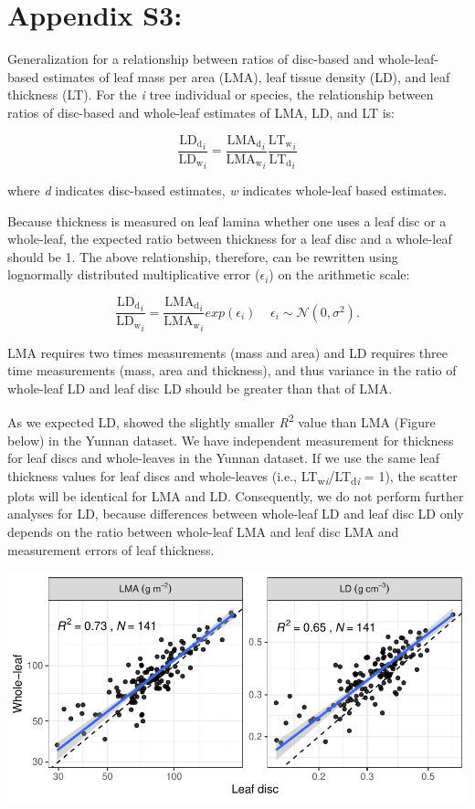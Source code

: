 \documentclass[
  12pt,
]{article}
\author{}
\date{\vspace{-2.5em}}
\begin{document}
\hypertarget{appendix-s3}{%
\section{Appendix S3:}\label{appendix-s3}}

Generalization for a relationship between ratios of disc-based and whole-leaf-based estimates of leaf mass per area (LMA), leaf tissue density (LD), and leaf thickness (LT).
For the \emph{i} tree individual or species, the relationship between ratios of disc-based and whole-leaf estimates of LMA, LD, and LT is:

\[
\frac{\mathrm{LD_d}_i}{\mathrm{LD_w}_i} = \frac{\mathrm{LMA_d}_i}{\mathrm{LMA_w}_i} \frac{\mathrm{LT_w}_i}{\mathrm{LT_d}_i}
\]

where \emph{d} indicates disc-based estimates, \emph{w} indicates whole-leaf based estimates.

Because thickness is measured on leaf lamina whether one uses a leaf disc or a whole-leaf, the expected ratio between thickness for a leaf disc and a whole-leaf should be 1.
The above relationship, therefore, can be rewritten using lognormally distributed multiplicative error (\(\epsilon_i\)) on the arithmetic scale:

\[
\frac{\mathrm{LD_d}_i}{\mathrm{LD_w}_i} = \frac{\mathrm{LMA_d}_i}{\mathrm{LMA_w}_i} exp(\epsilon_i) \;\;\;\;\epsilon_i \sim \mathcal{N}(0, \sigma^2).
\]

LMA requires two times measurements (mass and area) and LD requires three time measurements (mass, area and thickness), and thus variance in the ratio of whole-leaf LD and leaf disc LD should be greater than that of LMA.

As we expected LD, showed the slightly smaller \emph{R}\textsuperscript{2} value than LMA (Figure below) in the Yunnan dataset.
We have independent measurement for thickness for leaf discs and whole-leaves in the Yunnan dataset.
If we use the same leaf thickness values for leaf discs and whole-leaves (i.e., LT\textsubscript{w\emph{i}}/LT\textsubscript{d\emph{i}} = 1), the scatter plots will be identical for LMA and LD.
Consequently, we do not perform further analyses for LD, because differences between whole-leaf LD and leaf disc LD only depends on the ratio between whole-leaf LMA and leaf disc LMA and measurement errors of leaf thickness.

\includegraphics[width=6.25in,height=\textheight]{../figs/lma_ld.pdf}
\end{document}
